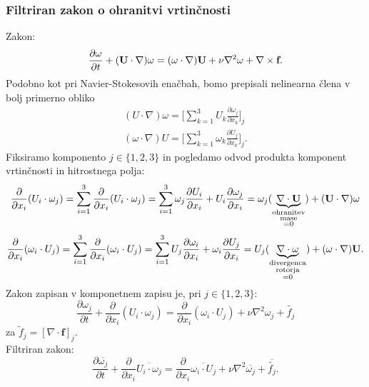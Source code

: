 \documentclass[mat2, tisk]{fmfdelo}
\newcommand{\bd}{\textbf}
\begin{document}
\subsubsection{Filtriran zakon o ohranitvi vrtinčnosti}

Zakon:
$$
\frac{\partial \text{\bd{$\omega$}}}{\partial t} + (\bd{U}\cdot \nabla)\text{\bd{$\omega$}} = (\text{\bd{$\omega$}} \cdot \nabla)\bd{U} + \nu \nabla^2 \text{\bd{$\omega$}} + \nabla \times \bd{f}. 
$$
Podobno kot pri Navier-Stokesovih enačbah, bomo prepisali nelinearna člena v bolj primerno 
obliko
\begin{align*}
(U \cdot \nabla) \omega = \Big[\sum_{k=1}^3 U_k \frac{\partial \omega_j}{\partial x_k}\Big]_j\\
(\omega \cdot \nabla) U= \Big[\sum_{k=1}^3 \omega_k \frac{\partial U_j}{\partial x_k}\Big]_j.
\end{align*}
Fiksiramo komponento $j\in\{1, 2, 3\}$ in pogledamo odvod produkta komponent vrtinčnosti in hitrostnega polja:
\begin{align*}
\frac{\partial}{\partial x_i} (U_i \cdot\omega_j) = \sum_{i=1}^3 \frac{\partial}{\partial x_i} (U_i \cdot\omega_j) = 
\sum_{i=1}^3 \omega_j\frac{\partial U_i}{\partial x_i} + U_i\frac{\partial \omega_j}{\partial x_i} = 
\omega_j (\underbrace{\nabla \cdot \bd{U}}_{\substack{\text{ohranitev}\\\text{mase}\\=0}}) + (\bd{U}\cdot\nabla)\text{\bd{$\omega$}}
\end{align*}
\begin{align*}
\frac{\partial}{\partial x_i} (\omega_i \cdot U_j) = \sum_{i=1}^3 \frac{\partial}{\partial x_i} (\omega_i \cdot U_j) = 
\sum_{i=1}^3 U_j\frac{\partial \omega_i}{\partial x_i} + \omega_i\frac{\partial U_j}{\partial x_i} = 
U_j (\underbrace{\nabla \cdot \text{\bd{$\omega$}}}_{\substack{\text{divergenca}\\\text{rotorja}\\=0}}) + (\text{\bd{$\omega$}}\cdot\nabla)\text{\bd{U}}.
\end{align*}
Zakon zapisan v komponetnem zapisu je, pri $j\in \{1, 2, 3\}$:
\begin{equation}
\frac{\partial \omega_j}{\partial t} + \frac{\partial}{\partial x_i} (U_i \cdot \omega_j) = 
\frac{\partial}{\partial x_i} (\omega_i \cdot U_j) + \nu \nabla^2 \omega_j + \tilde{f_j}
\end{equation}
za $\tilde{f}_j = [\nabla \cdot \bd{f}]_j$.\\
Filtriran zakon:
\begin{equation}
  \frac{\partial \overline{\omega_j}}{\partial t} + \frac{\partial}{\partial x_i} \overline{U_i \cdot \omega_j} = 
  \frac{\partial}{\partial x_i} \overline{\omega_i \cdot U_j} + \nu \nabla^2 \overline{\omega_j} + \overline{\tilde{f_j}}.
\end{equation}
\end{document}
